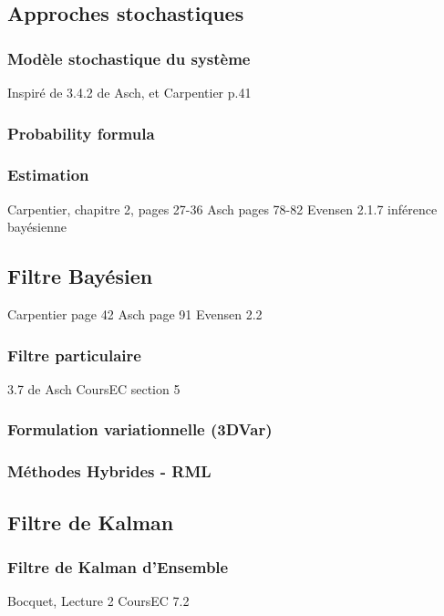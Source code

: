 \documentclass{article}
\begin{document}
\subsection{Approches stochastiques}

\subsubsection{Modèle stochastique du système}

Inspiré de 3.4.2 de Asch, et Carpentier p.41
\subsubsection{Probability formula}

\subsubsection{Estimation}

Carpentier, chapitre 2, pages 27-36
Asch pages 78-82
Evensen 2.1.7 inférence bayésienne
\subsection{Filtre Bayésien}

Carpentier page 42
Asch page 91
Evensen 2.2
\subsubsection{Filtre particulaire}

3.7 de Asch
CoursEC section 5
\subsubsection{Formulation variationnelle (3DVar)}

\subsubsection{Méthodes Hybrides - RML}

\subsection{Filtre de Kalman}

\subsubsection{Filtre de Kalman d'Ensemble}

Bocquet, Lecture 2
CoursEC 7.2
\end{document}
